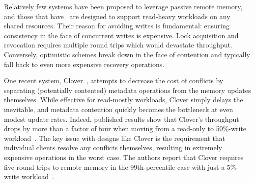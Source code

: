 Relatively few systems have been proposed to leverage passive remote
memory, and those that have~\cite{reigons,clover} are designed to
support read-heavy workloads on any shared resources.  Their reason
for avoiding writes is fundamental: ensuring consistency in the face
of concurrent writes is expensive. Lock acquisition and revocation
requires multiple round trips which would devastate throughput.
Conversely, optimistic schemes break down in the face of contention
and typically fall back to even more expensive recovery operations.

One recent system, Clover~\cite{clover}, attempts to decrease the cost
of conflicts by separating (potentially contented) metadata operations
from the memory updates themselves.  While effective for read-mostly
workloads, Clover simply delays the inevitable, and metadata
contention quickly becomes the bottleneck at even modest update rates.
Indeed, published results show that Clover's throughput drops by more
than a factor of four when moving from a read-only to 50\%-write
workload~\cite[Fig. 7]{clover}.
%
%
%
%
%
The key issue with designs like Clover is the requirement that
individual clients resolve any conflicts themselves, resulting in
extremely expensive operations in the worst case.  The authors report
that Clover requires five round trips to remote memory in the
99th-percentile case with just a 5\%-write workload~\cite[Table 2]{clover}.

